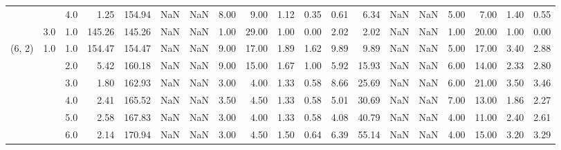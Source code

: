 \begin{tabular}{lllrrrrrrrrrrrrrrrr}
       &     & 4.0  &      1.25 &     154.94 &               NaN &                NaN &  8.00 &   9.00 &             1.12 &                         0.35 &      0.61 &       6.34 &               NaN &                NaN &  5.00 &   7.00 &             1.40 &                         0.55 \\
       & 3.0 & 1.0  &    145.26 &     145.26 &               NaN &                NaN &  1.00 &  29.00 &             1.00 &                         0.00 &      2.02 &       2.02 &               NaN &                NaN &  1.00 &  20.00 &             1.00 &                         0.00 \\
(6, 2) & 1.0 & 1.0  &    154.47 &     154.47 &               NaN &                NaN &  9.00 &  17.00 &             1.89 &                         1.62 &      9.89 &       9.89 &               NaN &                NaN &  5.00 &  17.00 &             3.40 &                         2.88 \\
       &     & 2.0  &      5.42 &     160.18 &               NaN &                NaN &  9.00 &  15.00 &             1.67 &                         1.00 &      5.92 &      15.93 &               NaN &                NaN &  6.00 &  14.00 &             2.33 &                         2.80 \\
       &     & 3.0  &      1.80 &     162.93 &               NaN &                NaN &  3.00 &   4.00 &             1.33 &                         0.58 &      8.66 &      25.69 &               NaN &                NaN &  6.00 &  21.00 &             3.50 &                         3.46 \\
       &     & 4.0  &      2.41 &     165.52 &               NaN &                NaN &  3.50 &   4.50 &             1.33 &                         0.58 &      5.01 &      30.69 &               NaN &                NaN &  7.00 &  13.00 &             1.86 &                         2.27 \\
       &     & 5.0  &      2.58 &     167.83 &               NaN &                NaN &  3.00 &   4.00 &             1.33 &                         0.58 &      4.08 &      40.79 &               NaN &                NaN &  4.00 &  11.00 &             2.40 &                         2.61 \\
       &     & 6.0  &      2.14 &     170.94 &               NaN &                NaN &  3.00 &   4.50 &             1.50 &                         0.64 &      6.39 &      55.14 &               NaN &                NaN &  4.00 &  15.00 &             3.20 &                         3.29 \\

\end{tabular}
